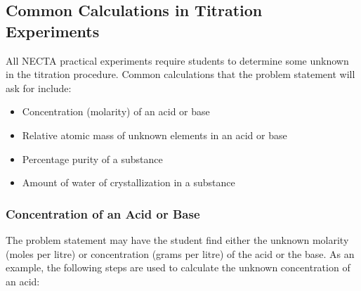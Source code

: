 %


\subsection{Common Calculations in Titration Experiments}
\label{sub:titcalc}

All NECTA practical experiments require students to determine some unknown in the titration procedure. Common calculations that the problem statement will ask for include:

\begin{itemize}

\item{Concentration (molarity) of an acid or base}
\item{Relative atomic mass of unknown elements in an acid or base}
\item{Percentage purity of a substance}
\item{Amount of water of crystallization in a substance}

\end{itemize}

\subsubsection{Concentration of an Acid or Base}

The problem statement may have the student find either the unknown molarity (moles per litre) or concentration (grams per litre) of the acid or the base. As an example, the following steps are used to calculate the unknown concentration of an acid:

